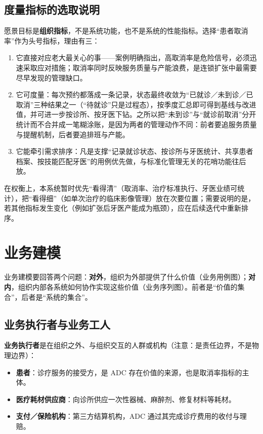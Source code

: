 \documentclass[11pt,a4paper]{ctexart}
\begin{document}
\subsection{度量指标的选取说明}

愿景目标是\textbf{组织指标}，不是系统功能，也不是系统的性能指标。选择“患者取消率”作为头号指标，理由有三：

\begin{enumerate}[leftmargin=1.8em,topsep=3pt,itemsep=2pt]
  \item 它直接对应老大最关心的事——案例明确指出，高取消率是危险信号，必须迅速采取应对措施；取消率同时反映服务质量与产能浪费，是连锁扩张中最需要尽早发现的管理缺口。
  \item 它可度量：每次预约都落成一条记录，状态最终收敛为“已就诊／未到诊／已取消”三种结果之一（“待就诊”只是过程态），按季度汇总即可得到基线与改进值，并可进一步按诊所、按牙医下钻。之所以把“未到诊”与“就诊前取消”分开统计而不合并成一笔糊涂账，是因为两者的管理动作不同：前者要追服务质量与提醒机制，后者要追排班与产能。
  \item 它能牵引需求排序：凡是支撑“记录就诊状态、按诊所与牙医统计、共享患者档案、按技能匹配牙医”的用例优先做，与标准化管理无关的花哨功能往后放。
\end{enumerate}

在权衡上，本系统暂时优先“看得清”（取消率、治疗标准执行、牙医业绩可统计），把“看得细”（如单次治疗的临床影像管理）放在次要位置；需要说明的是，若其他指标发生变化（例如扩张后牙医产能成为瓶颈），应在后续迭代中重新排序。

\section{业务建模}

业务建模要回答两个问题：\textbf{对外}，组织为外部提供了什么价值（业务用例图）；\textbf{对内}，组织内部各系统如何协作实现这些价值（业务序列图）。前者是“价值的集合”，后者是“系统的集合”。

\subsection{业务执行者与业务工人}

\textbf{业务执行者}是在组织之外、与组织交互的人群或机构（注意：是责任边界，不是物理边界）：

\begin{itemize}[leftmargin=1.6em,topsep=3pt,itemsep=2pt]
  \item \textbf{患者}：诊疗服务的接受方，是 ADC 存在价值的来源，也是取消率指标的主体。
  \item \textbf{医疗耗材供应商}：向诊所供应一次性器械、麻醉剂、修复材料等耗材。
  \item \textbf{支付／保险机构}：第三方结算机构，ADC 通过其完成诊疗费用的收付与理赔。
\end{itemize}
\end{document}
